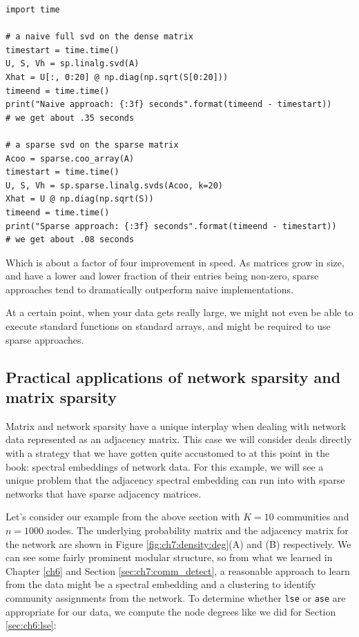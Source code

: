 \begin{lstlisting}[style=python]
import time

# a naive full svd on the dense matrix
timestart = time.time()
U, S, Vh = sp.linalg.svd(A)
Xhat = U[:, 0:20] @ np.diag(np.sqrt(S[0:20]))
timeend = time.time()
print("Naive approach: {:3f} seconds".format(timeend - timestart))
# we get about .35 seconds

# a sparse svd on the sparse matrix
Acoo = sparse.coo_array(A)
timestart = time.time()
U, S, Vh = sp.sparse.linalg.svds(Acoo, k=20)
Xhat = U @ np.diag(np.sqrt(S))
timeend = time.time()
print("Sparse approach: {:3f} seconds".format(timeend - timestart))
# we get about .08 seconds
\end{lstlisting}

Which is about a factor of four improvement in speed. As matrices grow in size, and have a lower and lower fraction of their entries being non-zero, sparse approaches tend to dramatically outperform naive implementations. 

At a certain point, when your data gets really large, we might not even be able to execute standard functions on standard arrays, and might be required to use sparse approaches.

\subsection{Practical applications of network sparsity and matrix sparsity}

Matrix and network sparsity have a unique interplay when dealing with network data represented as an adjacency matrix. This case we will consider deals directly with a strategy that we have gotten quite accustomed to at this point in the book: spectral embeddings of network data. For this example, we will see a unique problem that the adjacency spectral embedding can run into with sparse networks that have sparse adjacency matrices.

Let's consider our example from the above section with $K=10$ communities and $n=1000$ nodes. The underlying probability matrix and the adjacency matrix for the network are shown in Figure \ref{fig:ch7:density:deg}(A) and (B) respectively. We can see some fairly prominent modular structure, so from what we learned in Chapter \ref{ch6} and Section \ref{sec:ch7:comm_detect}, a reasonable approach to learn from the data might be a spectral embedding and a clustering to identify community assignments from the network. To determine whether \texttt{lse} or \texttt{ase} are appropriate for our data, we compute the node degrees like we did for Section \ref{sec:ch6:lse}:

